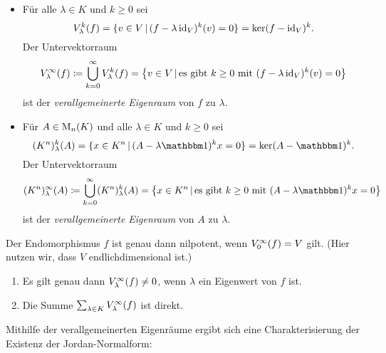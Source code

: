 \begin{definition}
  \leavevmode
  \begin{itemize}
    \item
      Für alle $\lambda \in K$ und $k \geq 0$ sei
      \[
          \heigenspace{V}{f}{\lambda}{k}
        = \{ v \in V \suchthat (f - \lambda \id_V)^k(v) = 0 \}
        = \ker (f - \id_V)^k.
      \]
      Der Untervektorraum
      \[
                  \geigenspace{V}{f}{\lambda}
        \coloneqq \bigcup_{k=0}^\infty \heigenspace{V}{f}{\lambda}{k}
        =         \left\{
                    v \in V
                  \suchthat
                    \text{es gibt $k \geq 0$ mit $(f - \lambda \id_V)^k(v) = 0$}
                  \right\}
      \]
      ist der \emph{verallgemeinerte Eigenraum} von $f$ zu $\lambda$.
    \item
      Für $A \in \matrices{n}{K}$ und alle $\lambda \in K$ und $k \geq 0$ sei
      \[
          \heigenspace{(K^n)}{A}{\lambda}{k}
        = \{ x \in K^n \suchthat (A - \lambda \Id)^k x = 0 \}
        = \ker (A - \Id)^k.
      \]
      Der Untervektorraum
      \[
                  \geigenspace{(K^n)}{A}{\lambda}
        \coloneqq \bigcup_{k=0}^\infty \heigenspace{(K^n)}{A}{\lambda}{k}
        =         \left\{
                    x \in K^n
                  \suchthat
                    \text{es gibt $k \geq 0$ mit $(A - \lambda \Id)^k x = 0$}
                  \right\}
      \]
      ist der \emph{verallgemeinerte Eigenraum} von $A$ zu $\lambda$.
  \end{itemize}
\end{definition}

\begin{example}
  Der Endomorphismus $f$ ist genau dann nilpotent, wenn $\geigenspace{V}{f}{0} = V$ gilt.
  (Hier nutzen wir, dass $V$ endlichdimensional ist.)
\end{example}

\begin{lemma}
  \leavevmode
  \begin{enumerate}
    \item
      Es gilt genau dann $\geigenspace{V}{f}{\lambda} \neq 0$, wenn $\lambda$ ein Eigenwert von $f$ ist.
    \item
      Die Summe $\sum_{\lambda \in K} \geigenspace{V}{f}{\lambda}$ ist direkt.
  \end{enumerate}
\end{lemma}

Mithilfe der verallgemeinerten Eigenräume ergibt sich eine Charakterisierung der Existenz der Jordan-Normalform:

